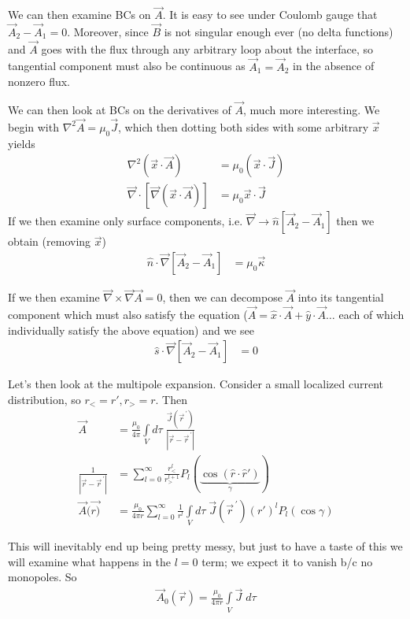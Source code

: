 \documentclass[10pt]{report}
\newcommand{\pvec}[1]{\vec{#1}^{\,\prime}}
\newcommand{\abs}[1]{\left|#1\right|}
\begin{document}
We can then examine BCs on $\vec{A}$. It is easy to see under Coulomb gauge that $\vec{A}_2 - \vec{A}_1 = 0$. Moreover, since $\vec{B}$ is not singular enough ever (no delta functions) and $\vec{A}$ goes with the flux through any arbitrary loop about the interface, so tangential component must also be continuous as $\vec{A}_1 = \vec{A}_2$ in the absence of nonzero flux.

We can then look at BCs on the derivatives of $\vec{A}$, much more interesting. We begin with $\nabla^2 \vec{A} = \mu_0 \vec{J}$, which then dotting both sides with some arbitrary $\vec{x}$ yields
\begin{align}
    \nabla^2(\vec{x}\cdot\vec{A}) &= \mu_0(\vec{x}\cdot\vec{J})\\
    \vec{\nabla}\cdot\left[ \vec{\nabla}(\vec{x} \cdot \vec{A}) \right] &= \mu_0 \vec{x}\cdot \vec{J}
\end{align}
If we then examine only surface components, i.e. $\vec{\nabla} \to \hat{n}[\vec{A}_2 - \vec{A}_1]$ then we obtain (removing $\vec{x}$)
\begin{align}
    \hat{n}\cdot\vec{\nabla}\left[ \vec{A}_2 - \vec{A}_1\right] &= \mu_0 \vec{\kappa}
\end{align}

If we then examine $\vec{\nabla}\times \vec{\nabla}\vec{A} = 0$, then we can decompose $\vec{A}$ into its tangential component which must also satisfy the equation ($\vec{A} = \hat{x} \cdot \vec{A} + \hat{y}\cdot \vec{A} \dots$ each of which individually satisfy the above equation) and we see
\begin{align}
    \hat{s}\cdot \vec{\nabla}\left[ \vec{A}_2 - \vec{A}_1 \right] &= 0
\end{align}

Let's then look at the multipole expansion. Consider a small localized current distribution, so $r_< = r', r_> = r$. Then
\begin{align}
    \vec{A} &= \frac{\mu_0}{4\pi}\int\limits_{V}^{}d\tau\;\frac{\vec{J}(\pvec{r})}{\abs{\vec{r} - \pvec{r}}}\\
    \frac{1}{\abs{\vec{r} - \pvec{r}}} &= \sum_{l=0}^{\infty}\frac{r_<^l}{r_>^{l+1}}P_l(\underbrace{\cos (\hat{r} \cdot \hat{r}')}_{\gamma})\\
    \vec{A}(\vec{r)} &= \frac{\mu_0}{4\pi r}\sum_{l=0}^{\infty}\frac{1}{r^l}\int\limits_{V}^{}d\tau\;\vec{J}(\pvec{r})(r')^lP_l(\cos\gamma)
\end{align}

This will inevitably end up being pretty messy, but just to have a taste of this we will examine what happens in the $l=0$ term; we expect it to vanish b/c no monopoles. So
\begin{align}
    \vec{A}_0(\vec{r}) = \frac{\mu_0}{4\pi r}\int\limits_{V}^{}\vec{J}\;d\tau
\end{align}
\end{document}
